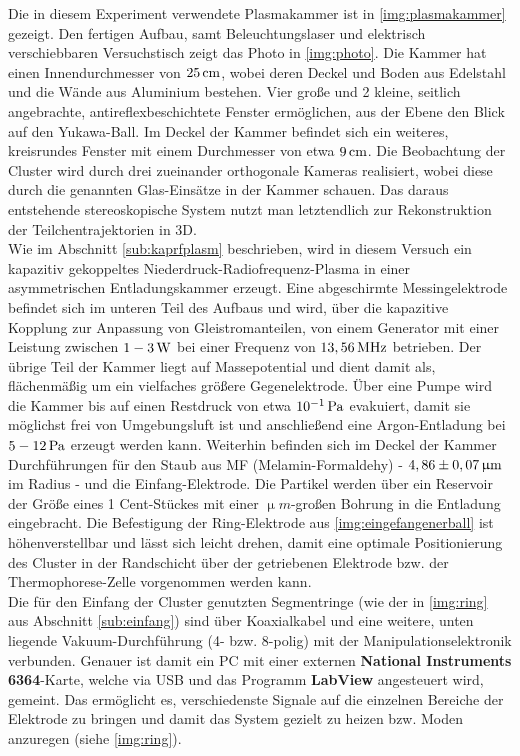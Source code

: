 \documentclass[numbers=noenddot,a4paper,notitlepage,twoside,BCOR15mm]{scrbook}
\newcommand{\tenpo}[1]{ 10^{#1}}
\newcommand{\fett}[1]{\textbf{#1}}
\begin{document}
			Die in diesem Experiment verwendete Plasmakammer ist in \autoref{img:plasmakammer} gezeigt. Den fertigen Aufbau, samt Beleuchtungslaser und elektrisch verschiebbaren Versuchstisch zeigt das Photo in \autoref{img:photo}. Die Kammer hat einen Innendurchmesser von $\unit[25]{cm}$, wobei deren Deckel und Boden aus Edelstahl und die Wände aus Aluminium bestehen. Vier gro{\ss}e und 2 kleine, seitlich angebrachte, antireflexbeschichtete Fenster erm\"oglichen,  aus der Ebene den Blick auf den Yukawa-Ball. Im Deckel der Kammer befindet sich ein weiteres, kreisrundes Fenster mit einem Durchmesser von etwa $\unit[9]{cm}$. Die Beobachtung der Cluster wird durch drei zueinander orthogonale Kameras realisiert, wobei diese durch die genannten Glas-Einsätze in der Kammer schauen. Das daraus entstehende stereoskopische System nutzt man letztendlich zur Rekonstruktion der Teilchentrajektorien in 3D.\\
			Wie im Abschnitt \ref{sub:kaprfplasm} beschrieben, wird in diesem Versuch ein kapazitiv gekoppeltes Niederdruck-Radiofrequenz-Plasma in einer asymmetrischen Entladungskammer erzeugt. Eine abgeschirmte Messingelektrode befindet sich im unteren Teil des Aufbaus und wird, \"uber die kapazitive Kopplung zur Anpassung von Gleistromanteilen, von einem Generator mit einer Leistung zwischen $\unit[1-3]{W}$ bei einer Frequenz von $\unit[13,56]{MHz}$ betrieben. Der \"ubrige Teil der Kammer liegt auf Massepotential und dient damit als, fl\"achenm\"a{\ss}ig um ein vielfaches gr\"o{\ss}ere Gegenelektrode. \"Uber eine Pumpe wird die Kammer bis auf einen Restdruck von etwa $\unit[\tenpo{-1}]{Pa}$ evakuiert, damit sie m\"oglichst frei von Umgebungsluft ist und anschlie{\ss}end eine Argon-Entladung bei $\unit[5-12]{Pa}$ erzeugt werden kann.
			Weiterhin befinden sich im Deckel der Kammer Durchf\"uhrungen f\"ur den Staub aus MF (Melamin-Formaldehy) - $\unit[4,86\pm0,07]{\upmu m}$ im Radius - und die Einfang-Elektrode. Die Partikel werden \"uber ein Reservoir der Gr\"o{\ss}e eines 1 Cent-St\"uckes mit einer $\unit{\upmu m}$-gro{\ss}en Bohrung in die Entladung eingebracht. Die Befestigung der Ring-Elektrode aus \autoref{img:eingefangenerball} ist h\"ohenverstellbar und l\"asst sich leicht drehen, damit eine optimale Positionierung des Cluster in der Randschicht \"uber der getriebenen Elektrode bzw. der Thermophorese-Zelle vorgenommen werden kann.\\
			Die für den Einfang der Cluster genutzten Segmentringe (wie der in \autoref{img:ring} aus Abschnitt \ref{sub:einfang}) sind \"uber Koaxialkabel und eine weitere, unten liegende Vakuum-Durchf\"uhrung (4- bzw. 8-polig) mit der Manipulationselektronik verbunden. Genauer ist damit ein PC mit einer externen \fett{National Instruments 6364}-Karte, welche via USB und das Programm \fett{LabView} angesteuert wird, gemeint. Das erm\"oglicht es, verschiedenste Signale auf die einzelnen Bereiche der Elektrode zu bringen und damit das System gezielt zu heizen bzw. Moden anzuregen (siehe \autoref{img:ring}). 
\end{document}
